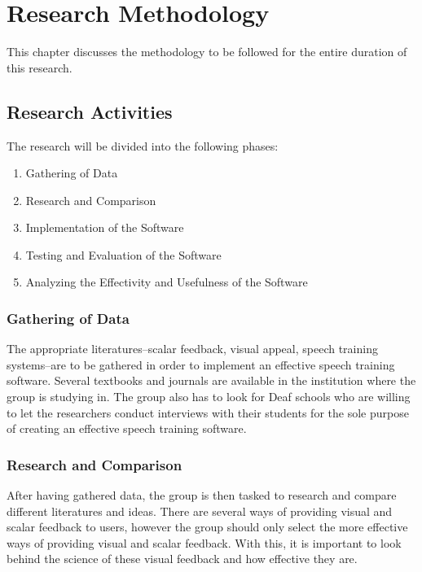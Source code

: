 %
%
%                 

\chapter{Research Methodology}
This chapter discusses the methodology to be followed for the entire duration of this research.

\section{Research Activities}
The research will be divided into the following phases:
\begin{enumerate}
\item Gathering of Data
\item Research and Comparison
\item Implementation of the Software
\item Testing and Evaluation of the Software
\item Analyzing the Effectivity and Usefulness of the Software
\end{enumerate}

\subsection{Gathering of Data}
The appropriate literatures--scalar feedback, visual appeal, speech training systems--are to be gathered in order to implement an effective speech training software. Several textbooks and journals are available in the institution where the group is studying in. The group also has to look for Deaf schools who are willing to let the researchers conduct interviews with their students for the sole purpose of creating an effective speech training software.

\subsection{Research and Comparison}
After having gathered data, the group is then tasked to research and compare different literatures and ideas. There are several ways of providing visual and scalar feedback to users, however the group should only select the more effective ways of providing visual and scalar feedback. With this, it is important to look behind the science of these visual feedback and how effective they are.

